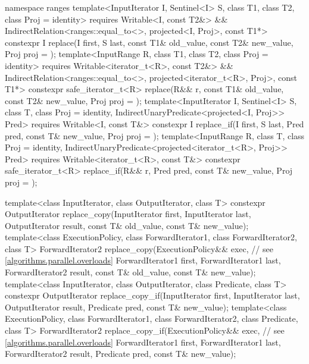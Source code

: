 \begin{codeblock}
{  namespace ranges {
    template<InputIterator I, Sentinel<I> S, class T1, class T2, class Proj = identity>
      requires Writable<I, const T2&> &&
               IndirectRelation<ranges::equal_to<>, projected<I, Proj>, const T1*>
      constexpr I
        replace(I first, S last, const T1& old_value, const T2& new_value, Proj proj = {});
    template<InputRange R, class T1, class T2, class Proj = identity>
      requires Writable<iterator_t<R>, const T2&> &&
               IndirectRelation<ranges::equal_to<>, projected<iterator_t<R>, Proj>, const T1*>
      constexpr safe_iterator_t<R>
        replace(R&& r, const T1& old_value, const T2& new_value, Proj proj = {});
    template<InputIterator I, Sentinel<I> S, class T, class Proj = identity,
             IndirectUnaryPredicate<projected<I, Proj>> Pred>
      requires Writable<I, const T&>
      constexpr I replace_if(I first, S last, Pred pred, const T& new_value, Proj proj = {});
    template<InputRange R, class T, class Proj = identity,
             IndirectUnaryPredicate<projected<iterator_t<R>, Proj>> Pred>
      requires Writable<iterator_t<R>, const T&>
      constexpr safe_iterator_t<R>
        replace_if(R&& r, Pred pred, const T& new_value, Proj proj = {});
  }

  template<class InputIterator, class OutputIterator, class T>
    constexpr OutputIterator replace_copy(InputIterator first, InputIterator last,
                                          OutputIterator result,
                                          const T& old_value, const T& new_value);
  template<class ExecutionPolicy, class ForwardIterator1, class ForwardIterator2, class T>
    ForwardIterator2 replace_copy(ExecutionPolicy&& exec, // see \ref{algorithms.parallel.overloads}
                                  ForwardIterator1 first, ForwardIterator1 last,
                                  ForwardIterator2 result,
                                  const T& old_value, const T& new_value);
  template<class InputIterator, class OutputIterator, class Predicate, class T>
    constexpr OutputIterator replace_copy_if(InputIterator first, InputIterator last,
                                             OutputIterator result,
                                             Predicate pred, const T& new_value);
  template<class ExecutionPolicy, class ForwardIterator1, class ForwardIterator2,
           class Predicate, class T>
    ForwardIterator2 replace_copy_if(ExecutionPolicy&& exec, // see \ref{algorithms.parallel.overloads}
                                     ForwardIterator1 first, ForwardIterator1 last,
                                     ForwardIterator2 result,
                                     Predicate pred, const T& new_value);

}
\end{codeblock}
